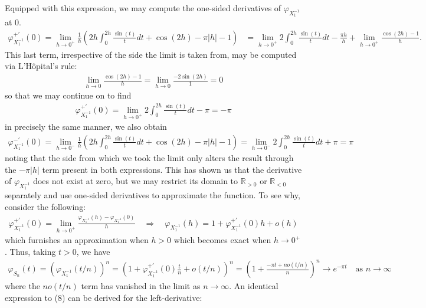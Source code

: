 \documentclass[10pt]{article}
\newcommand{\bp}[1]{\left({#1}\right)}
\newcommand{\mbb}[1]{\mathbb{#1}}
\newcommand{\1}[1]{\mathbbm{1}_{#1}}
\begin{document}
    Equipped with this expression, we may compute the one-sided derivatives of $\varphi_{X_1^{-1}}$ at $0$.
    \begin{align*}
        \varphi_{X_1^{-1}}^{+\prime}(0)=\lim_{h\rightarrow 0^+}\frac{1}{h}\bp{2h\int_0^{2h}\frac{\sin(t)}{t}dt+\cos(2h)-\pi|h|-1}&=\lim_{h\rightarrow 0^+}2\int_0^{2h}\frac{\sin(t)}{t}dt-\frac{\pi h}{h}+\lim_{h\rightarrow 0^+}\frac{\cos(2h)-1}{h}.
    \end{align*}
    This last term, irrespective of the side the limit is taken from, may be computed via L'H\^opital's rule:
    \begin{align*}
        \lim_{h\rightarrow 0}\frac{\cos(2h)-1}{h}=\lim_{h\rightarrow 0}\frac{-2\sin(2h)}{1}=0
    \end{align*}
    so that we may continue on to find
    \begin{align*}
        \varphi_{X_1^{-1}}^{+\prime}(0)=\lim_{h\rightarrow 0^+}2\int_0^{2h}\frac{\sin(t)}{t}dt-\pi=-\pi
    \end{align*}
    in precisely the same manner, we also obtain
    \begin{align*}
        \varphi_{X_1^{-1}}^{-\prime}(0)=\lim_{h\rightarrow 0^-}\frac{1}{h}\bp{2h\int_0^{2h}\frac{\sin(t)}{t}dt+\cos(2h)-\pi|h|-1}=\lim_{h\rightarrow 0^-}2\int_0^{2h}\frac{\sin(t)}{t}dt+\pi=\pi
    \end{align*}
    noting that the side from which we took the limit only alters the result through the $-\pi|h|$ term present in both expressions. This has shown us that the derivative of $\varphi_{X_1^{-1}}$ does not exist at zero,
    but we may restrict its domain to $\mbb{R}_{>0}$ or $\mbb{R}_{<0}$ separately and use one-sided derivatives to approximate the function. To see why, consider the following:
    \begin{align*}
        \varphi_{X_1^{-1}}^{+\prime}(0)=\lim_{h\rightarrow 0^+}\frac{\varphi_{X_1^{-1}}(h)-\varphi_{X_1^{-1}}(0)}{h}\quad\Rightarrow\quad\varphi_{X_1^{-1}}(h)=1+\varphi_{X_1^{-1}}^{+\prime}(0)h+o(h)\tag{8}
    \end{align*}
    which furnishes an approximation when $h>0$ which becomes exact when $h\rightarrow 0^+$. Thus, taking $t>0$, we have
    \begin{align*}
        \varphi_{S_n}(t)=(\varphi_{X_1^{-1}}(t/n))^n=\bp{1+\varphi_{X_1^{-1}}^{+\prime}(0)\frac{t}{n}+o(t/n)}^n=\bp{1+\frac{-\pi t+no(t/n)}{n}}^n\longrightarrow e^{-\pi t}\quad\text{as $n\rightarrow\infty$}\tag{9}
    \end{align*}
    where the $no(t/n)$ term has vanished in the limit as $n\rightarrow\infty$. An identical expression to (8) can be derived for the left-derivative:
\end{document}
